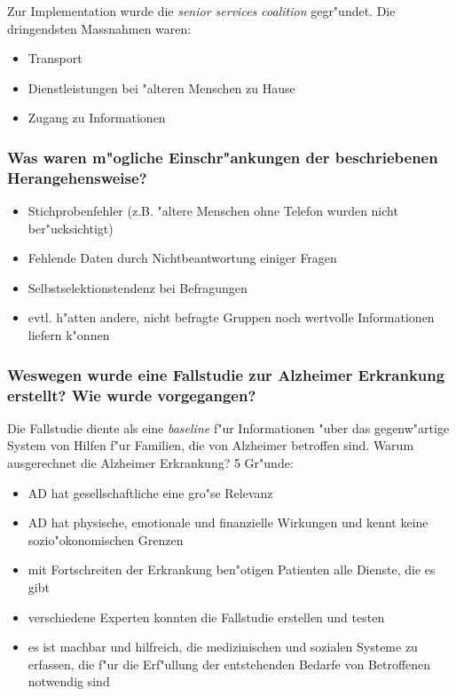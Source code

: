 Zur Implementation wurde die \emph{senior services coalition} gegr"undet. Die dringendsten Massnahmen waren:
\begin{itemize}
        \item Transport 
        \item Dienstleistungen bei "alteren Menschen zu Hause
        \item Zugang zu Informationen
\end{itemize}

\subsubsection{Was waren m"ogliche Einschr"ankungen der beschriebenen Herangehensweise?}
\begin{itemize}
        \item Stichprobenfehler (z.B. "altere Menschen ohne Telefon wurden nicht ber"ucksichtigt)
        \item Fehlende Daten durch Nichtbeantwortung einiger Fragen
        \item Selbstselektionstendenz bei Befragungen 
        \item evtl. h"atten andere, nicht befragte Gruppen noch wertvolle Informationen liefern k"onnen
\end{itemize}

\subsubsection{Weswegen wurde eine Fallstudie zur Alzheimer Erkrankung erstellt? Wie wurde vorgegangen?}
Die Fallstudie diente als eine \emph{baseline} f"ur Informationen "uber das gegenw"artige System von Hilfen f"ur Familien, die von Alzheimer betroffen sind. Warum ausgerechnet die Alzheimer Erkrankung? 5 Gr"unde:
\begin{itemize}
        \item AD hat gesellschaftliche eine gro"se Relevanz
        \item AD hat physische, emotionale und finanzielle Wirkungen und kennt keine sozio"okonomischen Grenzen
        \item mit Fortschreiten der Erkrankung ben"otigen Patienten alle Dienste, die es gibt
        \item verschiedene Experten konnten die Fallstudie erstellen und testen
        \item es ist machbar und hilfreich, die medizinischen und sozialen Systeme zu erfassen, die f"ur die Erf"ullung der entstehenden Bedarfe von Betroffenen notwendig sind
\end{itemize}

